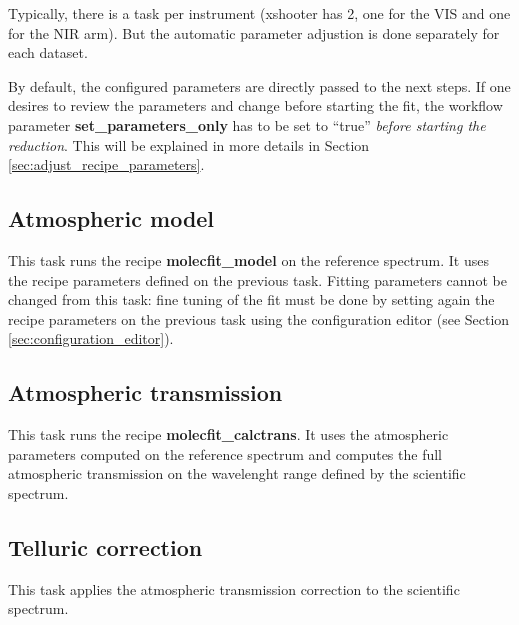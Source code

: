 Typically, there is a task per instrument (xshooter has 2, one for the
VIS and one for the NIR arm). But the automatic parameter adjustion is
done separately for each dataset.

By default, the configured parameters are directly passed to the next
steps. If one desires to review the parameters and change before
starting the fit, the workflow parameter {\bf set\_parameters\_only}
has to be set to ``true'' {\it before starting the reduction}. This will be
explained in more details in Section 
\ref{sec:adjust_recipe_parameters}.

\subsection{Atmospheric model}

This task runs the recipe {\bf molecfit\_model} on the reference
spectrum. It uses the recipe parameters defined on the previous task.
Fitting parameters cannot be changed from this task: fine tuning of
the fit must be done by setting again the recipe parameters on the
previous task using the configuration editor (see Section
\ref{sec:configuration_editor}).

\subsection{Atmospheric transmission}

This task runs the recipe {\bf molecfit\_calctrans}. It uses the
atmospheric parameters computed on the reference spectrum and computes
the full atmospheric transmission on the wavelenght range defined by
the scientific spectrum.

\subsection{Telluric correction}

This task applies the atmospheric transmission correction to the
scientific spectrum.
